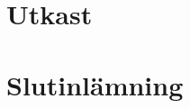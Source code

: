 \begin{questions}
\begin{figure}[H]
\end{figure}
\newpage
\section*{Utkast}
\newpage
{}
\newpage
\section*{Slutinlämning}
\newpage
{}


\end{questions}

